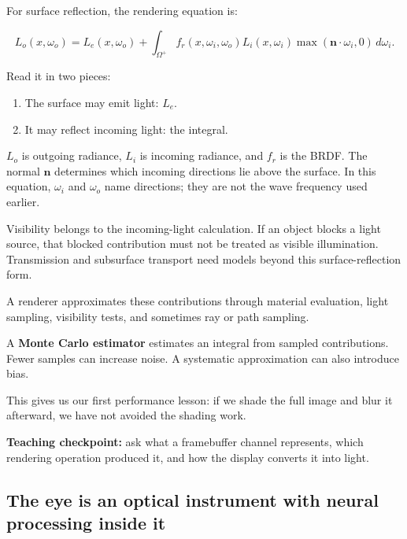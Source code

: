 For surface reflection, the rendering equation is:

\[
L_o(x,\omega_o)=L_e(x,\omega_o)+
\int_{\Omega^+}
f_r(x,\omega_i,\omega_o)L_i(x,\omega_i)
\max(\mathbf n\cdot\omega_i,0)\,d\omega_i.
\]

Read it in two pieces:

\begin{enumerate}
\def\labelenumi{\arabic{enumi}.}
\tightlist
\item
  The surface may emit light: \(L_e\).
\item
  It may reflect incoming light: the integral.
\end{enumerate}

\(L_o\) is outgoing radiance, \(L_i\) is incoming radiance, and \(f_r\) is the BRDF. The normal \(\mathbf n\) determines which incoming directions lie above the surface. In this equation, \(\omega_i\) and \(\omega_o\) name directions; they are not the wave frequency used earlier.

Visibility belongs to the incoming-light calculation. If an object blocks a light source, that blocked contribution must not be treated as visible illumination. Transmission and subsurface transport need models beyond this surface-reflection form.

A renderer approximates these contributions through material evaluation, light sampling, visibility tests, and sometimes ray or path sampling.

A \textbf{Monte Carlo estimator} estimates an integral from sampled contributions. Fewer samples can increase noise. A systematic approximation can also introduce bias.

This gives us our first performance lesson: if we shade the full image and blur it afterward, we have not avoided the shading work.

\textbf{Teaching checkpoint:} ask what a framebuffer channel represents, which rendering operation produced it, and how the display converts it into light.

\subsection{The eye is an optical instrument with neural processing inside it}\label{04-visual-computing-ii-ch043-the-eye-is-an-optical-instrument-with-neural-processing-inside-it}

\hypertarget{04-visual-computing-ii-ch043-the-eye-is-an-optical-instrument-with-neural-processing-inside-it}{}

